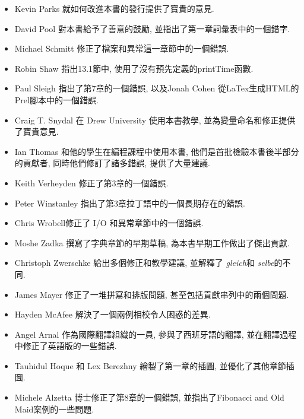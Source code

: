 \documentclass[10pt]{book}
\begin{document}
\begin{itemize}
\item Kevin Parks 就如何改進本書的發行提供了寶貴的意見. 

\item David Pool 對本書給予了善意的鼓勵, 並指出了第一章詞彙表中的一個錯字. 

\item Michael Schmitt 修正了檔案和異常這一章節中的一個錯誤. 

\item Robin Shaw 指出13.1節中, 使用了沒有預先定義的printTime函數. 

\item Paul Sleigh 指出了第7章的一個錯誤, 
以及Jonah Cohen 從LaTex生成HTML的Prel腳本中的一個錯誤. 

\item Craig T. Snydal 在 Drew University 使用本書教學, 
並為變量命名和修正提供了寶貴意見. 

\item Ian Thomas 和他的學生在編程課程中使用本書, 
他們是首批檢驗本書後半部分的貢獻者, 同時他們修訂了諸多錯誤, 提供了大量建議. 

\item Keith Verheyden 修正了第3章的一個錯誤. 

\item Peter Winstanley 指出了第3章拉丁語中的一個長期存在的錯誤. 

\item Chris Wrobell修正了 I/O 和異常章節中的一個錯誤. 

\item Moshe Zadka 撰寫了字典章節的早期草稿, 為本書早期工作做出了傑出貢獻. 

\item Christoph Zwerschke 給出多個修正和教學建議, 並解釋了
 {\em gleich}和 {\em selbe}的不同. 

\item James Mayer 修正了一堆拼寫和排版問題, 甚至包括貢獻串列中的兩個問題. 

\item Hayden McAfee 解決了一個兩例相校令人困惑的差異. 

\item Angel Arnal 作為國際翻譯組織的一員, 參與了西班牙語的翻譯, 
並在翻譯過程中修正了英語版的一些錯誤. 

\item Tauhidul Hoque 和 Lex Berezhny 繪製了第一章的插圖, 並優化了其他章節插圖. 

\item Michele Alzetta 博士修正了第8章的一個錯誤, 
並指出了Fibonacci and Old Maid案例的一些問題. 


\end{itemize}
\end{document}
